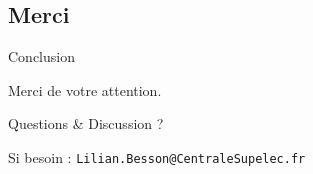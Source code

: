 \documentclass[11pt,french,ignorenonframetext,]{beamer}
\newcommand{\Fontify}{}
\begin{document}
\subsection{Merci}
\begin{frame}{Conclusion}

\begin{center}
  \begin{Large}
    {\Fontify Merci de votre attention.}
    \Innocey[1.2]
  \end{Large}
\end{center}

\vspace*{20pt}

\begin{center}
  \begin{Large}
    Questions \& Discussion ?
  \end{Large}
\end{center}

\vspace*{20pt}

\begin{center}
  \begin{Large}
    Si besoin :
    \texttt{Lilian.Besson{@}CentraleSupelec.fr}
  \end{Large}
\end{center}

\end{frame}
\end{document}

